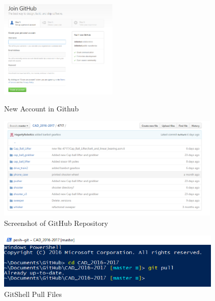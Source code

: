 \begin{figure}[ht]
\centering
\begin{minipage}[b]{.48\textwidth}
  \centering
  \includegraphics[width=0.5\textwidth]{Meetings/September/09-23-21/githubnewacc.png}
  \caption{New Account in Github}
  \label{fig:092322_1}
\end{minipage}%
\hfill%
\begin{minipage}[b]{.48\textwidth}
  \centering
  \includegraphics[width=0.95\textwidth]{Meetings/September/09-23-21/githubrepository.png}
  \caption{Screenshot of GitHub Repository}
  \label{fig:092322_2}
\end{minipage}
\end{figure}




\begin{figure}
\centering
\includegraphics[width=0.955\textwidth, angle=0]{Meetings/September/09-23-21/gitshellpull.png}
\caption{GitShell Pull Files}
\label{fig:092322_3}
\end{figure}


